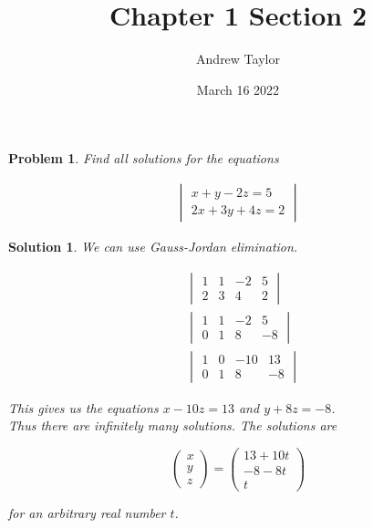 \documentclass{article}
\title{Chapter 1 Section 2}
\author{Andrew Taylor}
\date{March 16 2022}
\newtheorem{problem}{Problem}
\newtheorem{solution}{Solution}
\begin{document}
\maketitle

\begin{problem}
Find all solutions for the equations

\begin{align*}
\begin{vmatrix}
x + y - 2z = 5 \\
2x + 3y + 4z = 2
\end{vmatrix}
\end{align*}
\end{problem}

\begin{solution}

We can use Gauss-Jordan elimination.

\begin{align*}
&\begin{vmatrix}
1 & 1 & -2 & 5 \\ 
2 & 3 & 4 & 2 
\end{vmatrix} \\
&\begin{vmatrix}
1 & 1 & -2 & 5 \\ 
0 & 1 & 8 & -8 
\end{vmatrix} \\
&\begin{vmatrix}
1 & 0 & -10 & 13 \\ 
0 & 1 & 8 & -8 
\end{vmatrix}
\end{align*}

This gives us the equations $x - 10z = 13$ and $y + 8z = -8$. \\

Thus there are infinitely many solutions. The solutions are 

\begin{equation*}
\begin{pmatrix}x \\ y \\ z \end{pmatrix} = \begin{pmatrix}13 + 10t \\ -8 - 8t \\ t \end{pmatrix}
\end{equation*}

for an arbitrary real number $t$.

\end{solution}
\end{document}
